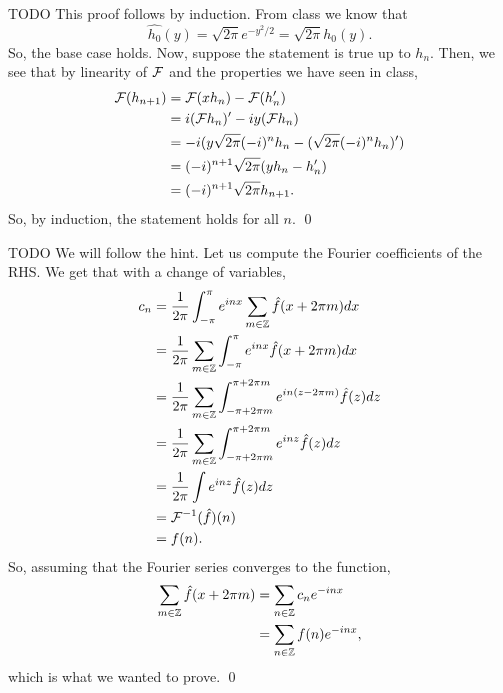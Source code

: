 \documentclass{article}
\begin{document}
\newpage
{} TODO \tri
\hop 
\solution
This proof follows by induction. From class we know that 
\[\hat{h_0}(y)=\sqrt{2\pi}e^{-y^2/2} = \sqrt{2\pi}h_0(y).\] 
So, the base case holds. Now, suppose the statement is true up to $h_n$. Then, we see that by linearity of $\cal{F}$ and the properties we have seen in class,
\begin{align*}
    \cal{F}(h_{n+1}) &= \cal{F}(xh_n)-\cal{F}(h_n')\\
    &= i(\cal{F}h_n)' - iy(\cal{F}h_n) \\
    &= -i(y\sqrt{2\pi}(-i)^n h_n - (\sqrt{2\pi}(-i)^n h_n)') \\
    &= (-i)^{n+1}\sqrt{2\pi}(yh_n - h_n')\\
    &= (-i)^{n+1}\sqrt{2\pi}h_{n+1}.
\end{align*}
So, by induction, the statement holds for all $n$. \qed

\newpage
{} TODO  \tri
\hop 
\solution
We will follow the hint. Let us compute the Fourier coefficients of the RHS. We get that with a change of variables,
\begin{align*}
    c_n  &= \frac{1}{2\pi} \int_{-\pi}^\pi e^{inx}\sum_{m \in \ZZ}\hat{f}(x+2\pi m) dx \\
    &= \frac{1}{2\pi} \sum_{m \in \ZZ} \int_{-\pi}^\pi e^{inx}\hat{f}(x+2\pi m) dx \\
    &= \frac{1}{2\pi} \sum_{m \in \ZZ} \int_{-\pi+2\pi m}^{\pi+2\pi m} e^{in(z - 2\pi m)}\hat{f}(z) dz \\
    &= \frac{1}{2\pi} \sum_{m \in \ZZ} \int_{-\pi+2\pi m}^{\pi+2\pi m} e^{inz}\hat{f}(z) dz \\
    &= \frac{1}{2\pi} \int e^{inz}\hat{f}(z) dz \\
    &= \cal{F}\inv(\hat{f})(n) \\
    &= f(n).
\end{align*}
So, assuming that the Fourier series converges to the function, 
\begin{align*}
    \sum_{m \in \ZZ}\hat{f}(x+2\pi m) &=  \sum_{n \in \ZZ}c_ne^{-inx}\\
    &= \sum_{n \in \ZZ}f(n)e^{-inx},
\end{align*}
which is what we wanted to prove. \qed
\end{document}
